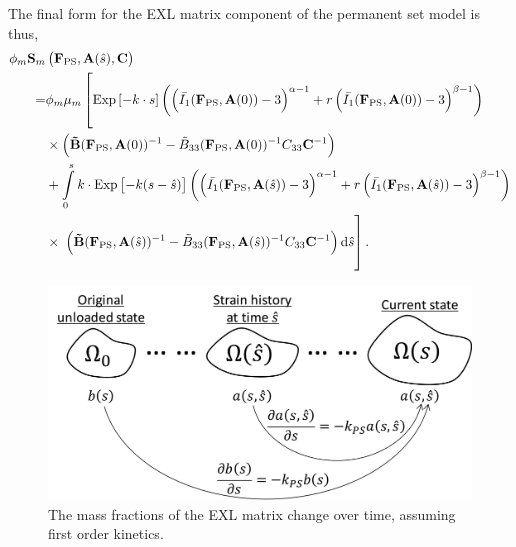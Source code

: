     The final form for the EXL matrix component of the permanent set model is thus,
\begin{equation}
\begin{split}
\phi_m \mathbf{S}_m &\left(\mathbf{F}_\mathrm{PS}, \mathbf{A}(\hat{s}),\mathbf{C}\right) \\
=& \phi_m \mu_m \left[ \vphantom{\int\displaylimits_0^s} \mathrm{Exp}\left[-k  \cdot s\right]  \left(\left( \bar{I_1} (\mathbf{F}_\mathrm{PS}, \mathbf{A}(0)) - 3\right)^{\alpha - 1} + r \left( \bar{I_1} (\mathbf{F}_\mathrm{PS}, \mathbf{A}(0)) - 3\right)^{\beta - 1}\right)  \right.\\
&\times \left( \mathbf{\tilde{B}}(\mathbf{F}_\mathrm{PS}, \mathbf{A}(0))^{-1} - \tilde{B}_{33}(\mathbf{F}_\mathrm{PS}, \mathbf{A}(0))^{-1}C_{33}\mathbf{C}^{-1}\right) \\
&+ \int\displaylimits_0^s k \cdot \mathrm{Exp}\left[-k (s - \hat{s})\right] \left(\left( \bar{I_1} (\mathbf{F}_\mathrm{PS}, \mathbf{A}(\hat{s})) - 3\right)^{\alpha - 1} + r \left( \bar{I_1} (\mathbf{F}_\mathrm{PS}, \mathbf{A}(\hat{s})) - 3\right)^{\beta - 1}\right) \\
&\times \left. \vphantom{\int\displaylimits_-^s} \left( \mathbf{\tilde{B}}(\mathbf{F}_\mathrm{PS}, \mathbf{A}(\hat{s}))^{-1} - \tilde{B}_{33}(\mathbf{F}_\mathrm{PS}, \mathbf{A}(\hat{s}))^{-1}C_{33}\mathbf{C}^{-1}\right) \mathrm{d}\hat{s}\right].
\end{split}
\end{equation}

\begin{figure}[hbt]
\centering
\includegraphics[width=4.5in]{Images/chapter4/figure9}
\caption{The mass fractions of the EXL matrix change over time, assuming first order kinetics. }
\label{fig:masstransfer}
\end{figure}


